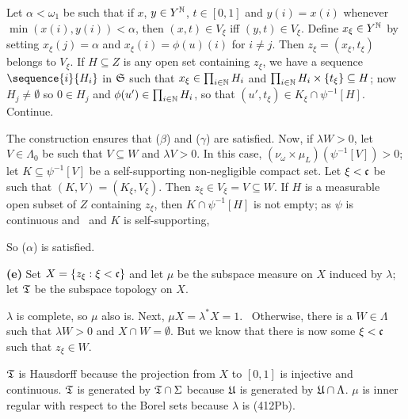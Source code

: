 {Let $\alpha<\omega_1$ be such that
if $x$, $y\in Y^{\Bbb N}$, $t\in[0,1]$ and $y(i)=x(i)$ whenever
$\min(x(i),y(i))<\alpha$, then $(x,t)\in V_{\xi}$ iff $(y,t)\in V_{\xi}$.
Define $x_{\xi}\in Y^{\Bbb N}$ by setting $x_{\xi}(j)=\alpha$ and
$x_{\xi}(i)=\phi(u)(i)$ for $i\ne j$.   Then
$z_{\xi}=(x_{\xi},t_{\xi})$ belongs to $V_{\xi}$.   If $H\subseteq Z$ is
any open set containing $z_{\xi}$, we have a sequence
$\sequence{i}{H_i}$ in $\frak S$ such that
$x_{\xi}\in\prod_{i\in\Bbb N}H_i$ and
$\prod_{i\in\Bbb N}H_i\times\{t_{\xi}\}\subseteq H$;  now $H_j\ne\emptyset$
so $0\in H_j$ and $\phi(u')\in\prod_{i\in\Bbb N}H_i$, so that
$(u',t_{\xi})\in K_{\xi}\cap\psi^{-1}[H]$.
Continue.

The construction ensures that ($\beta$) and ($\gamma$) are satisfied.
Now, if $\lambda W>0$, let $V\in\Lambda_0$ be such that $V\subseteq W$ and
$\lambda V>0$.   In this case,
$(\nu_{\omega}\times\mu_L)(\psi^{-1}[V])>0$;  let
$K\subseteq\psi^{-1}[V]$ be a self-supporting non-negligible compact set.
Let $\xi<\frak c$ be such that $(K,V)=(K_{\xi},V_{\xi})$.   Then
$z_{\xi}\in V_{\xi}=V\subseteq W$.   If $H$ is a measurable open subset of
$Z$ containing $z_{\xi}$, then $K\cap\psi^{-1}[H]$ is not empty;  as $\psi$
is continuous and \imp\ and $K$ is self-supporting,


\noindent So ($\alpha$) is satisfied.\ \Qed

\medskip

{\bf (e)} Set $X=\{z_{\xi}:\xi<\frak c\}$ and let $\mu$ be the subspace
measure on $X$ induced by $\lambda$;  let $\frak T$ be the subspace
topology on $X$.

\medskip

 $\lambda$ is complete, so $\mu$ also is.   Next,
$\mu X=\lambda^*X=1$.   \Prf\Quer\ Otherwise, there is a $W\in\Lambda$ such
that $\lambda W>0$ and $X\cap W=\emptyset$.   But we know that there is now
some $\xi<\frak c$ such that $z_{\xi}\in W$.\ \Bang\Qed

\medskip

 $\frak T$ is Hausdorff because the projection from $X$ to
$[0,1]$ is injective and continuous.   $\frak T$ is generated by
$\frak T\cap\Sigma$ because $\frak U$ is generated by $\frak U\cap\Lambda$.
$\mu$ is inner regular with respect to the Borel sets because $\lambda$ is
(412Pb).

}
